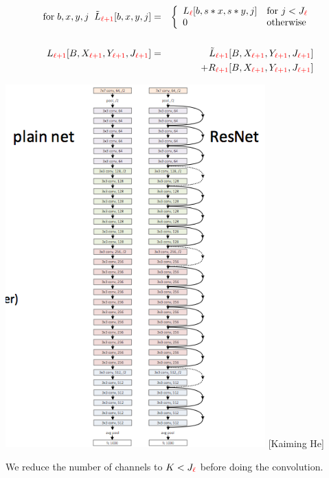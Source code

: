 {\begin{eqnarray*}
\mathrm{for}\;b,x,y,j\;\;\tilde{L}_{\color{red} \ell+1}[b,x,y,j] & = & \left\{\begin{array}{ll} L_{\color{red} \ell}[b,s*x,s*y,j] & \mbox{for $j < J_{\color{red} \ell}$} \\ 0 & \mbox{otherwise} \end{array}\right.\\
\\
L_{\color{red} \ell+1}[B,X_{\color{red} \ell +1},Y_{\color{red} \ell+1},J_{\color{red}\ell +1}] & = & \tilde{L}_{\color{red} \ell+1}[B,X_{\color{red} \ell +1},Y_{\color{red} \ell+1},J_{\color{red}\ell +1}] \\
& & + R_{\color{red} \ell+1}[B,X_{\color{red} \ell +1},Y_{\color{red} \ell+1},J_{\color{red}\ell +1}]
\end{eqnarray*}


\centerline{\includegraphics[height= 5.5in]{../images/ResnetStack} {\large [Kaiming He]}}


We reduce the number of channels to $K < J_{\color{red} \ell}$ before doing the convolution.

}
